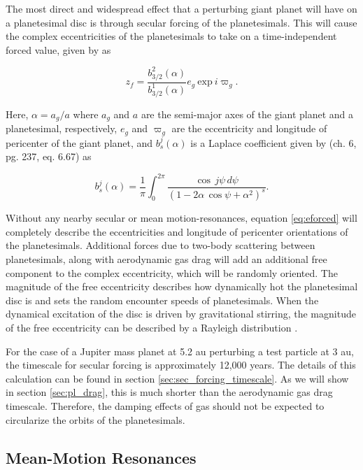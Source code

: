 The most direct and widespread effect that a perturbing giant planet will have on a planetesimal disc is through secular forcing of 
the planetesimals. This will cause the complex eccentricities of the planetesimals to take on a time-independent forced value, 
given by \cite{wyatt99} as

\begin{equation}\label{eq:eforced}
	z_{f} = \frac{b^{2}_{3/2} (\alpha)}{b^{1}_{3/2} (\alpha)} e_{g} ~ \mathrm{exp} ~ i \varpi_{g}.
\end{equation}

\noindent Here, $\alpha = a_{g} / a$ where $a_{g}$ and $a$ are the semi-major axes of the giant planet and a planetesimal, 
respectively, $e_{g}$ and $\varpi_{g}$ are the eccentricity and longitude of pericenter of the giant planet, and $b^{j}_{s} (\alpha)$ 
is a Laplace coefficient given by \cite{murray99} (ch. 6, pg. 237, eq. 6.67) as

\begin{equation}\label{eq:lap}
	b_{s}^{j}(\alpha) = \frac{1}{\pi} \int_{0}^{2 \pi} \frac{\cos \, j \psi \, d \psi}{\left( 1 - 2 \alpha \, \cos \psi + \alpha^2 \right)^{s}}.
\end{equation}

Without any nearby secular or mean motion-resonances, equation \ref{eq:eforced} will completely describe the eccentricities and 
longitude of  pericenter orientations of the planetesimals. Additional forces due to two-body scattering between planetesimals, 
along with aerodynamic gas drag will add an additional free component to the complex eccentricity, which will be randomly 
oriented. The magnitude of the free eccentricity describes how dynamically hot the planetesimal disc is and sets the random 
encounter speeds of planetesimals. When the dynamical excitation of the disc is driven by gravitational stirring, the magnitude of 
the free eccentricity can be described by a Rayleigh distribution \cite{ida92}.

For the case of a Jupiter mass planet at 5.2 au perturbing a test particle at 3 au, the timescale for secular forcing is 
approximately 12,000 years. The details of this calculation can be found in section \ref{sec:sec_forcing_timescale}. As we will show in section \ref{sec:pl_drag}, this is much shorter than the aerodynamic gas drag timescale. Therefore, the damping effects of gas should not be expected to circularize the orbits of the planetesimals.

\subsection{Mean-Motion Resonances}\label{sec:mmr}

